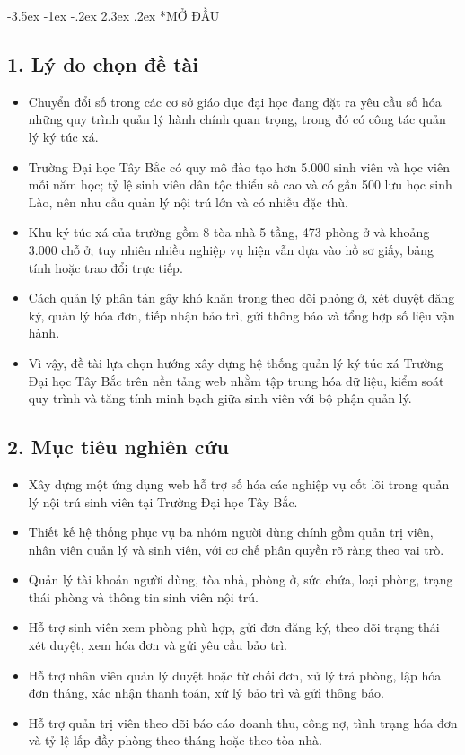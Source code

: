 \documentclass[13pt,a4paper]{extarticle}
\makeatletter
\renewcommand\section{\@startsection {section}{1}{\z@}%
	{-3.5ex \@plus -1ex \@minus -.2ex}%
	{2.3ex \@plus .2ex}%
	{\centering\normalfont\Large\bfseries}}
\makeatother
\begin{document}
	
	\section*{MỞ ĐẦU}
	
	\subsection*{1. Lý do chọn đề tài}
	\begin{itemize}
		\item Chuyển đổi số trong các cơ sở giáo dục đại học đang đặt ra yêu cầu số hóa những quy trình quản lý hành chính quan trọng, trong đó có công tác quản lý ký túc xá.
		\item Trường Đại học Tây Bắc có quy mô đào tạo hơn 5.000 sinh viên và học viên mỗi năm học; tỷ lệ sinh viên dân tộc thiểu số cao và có gần 500 lưu học sinh Lào, nên nhu cầu quản lý nội trú lớn và có nhiều đặc thù.
		\item Khu ký túc xá của trường gồm 8 tòa nhà 5 tầng, 473 phòng ở và khoảng 3.000 chỗ ở; tuy nhiên nhiều nghiệp vụ hiện vẫn dựa vào hồ sơ giấy, bảng tính hoặc trao đổi trực tiếp.
		\item Cách quản lý phân tán gây khó khăn trong theo dõi phòng ở, xét duyệt đăng ký, quản lý hóa đơn, tiếp nhận bảo trì, gửi thông báo và tổng hợp số liệu vận hành.
		\item Vì vậy, đề tài lựa chọn hướng xây dựng hệ thống quản lý ký túc xá Trường Đại học Tây Bắc trên nền tảng web nhằm tập trung hóa dữ liệu, kiểm soát quy trình và tăng tính minh bạch giữa sinh viên với bộ phận quản lý.
	\end{itemize}
	
	\subsection*{2. Mục tiêu nghiên cứu}
	\begin{itemize}
		\item Xây dựng một ứng dụng web hỗ trợ số hóa các nghiệp vụ cốt lõi trong quản lý nội trú sinh viên tại Trường Đại học Tây Bắc.
		\item Thiết kế hệ thống phục vụ ba nhóm người dùng chính gồm quản trị viên, nhân viên quản lý và sinh viên, với cơ chế phân quyền rõ ràng theo vai trò.
		\item Quản lý tài khoản người dùng, tòa nhà, phòng ở, sức chứa, loại phòng, trạng thái phòng và thông tin sinh viên nội trú.
		\item Hỗ trợ sinh viên xem phòng phù hợp, gửi đơn đăng ký, theo dõi trạng thái xét duyệt, xem hóa đơn và gửi yêu cầu bảo trì.
		\item Hỗ trợ nhân viên quản lý duyệt hoặc từ chối đơn, xử lý trả phòng, lập hóa đơn tháng, xác nhận thanh toán, xử lý bảo trì và gửi thông báo.
		\item Hỗ trợ quản trị viên theo dõi báo cáo doanh thu, công nợ, tình trạng hóa đơn và tỷ lệ lấp đầy phòng theo tháng hoặc theo tòa nhà.
	\end{itemize}
	
\end{document}
